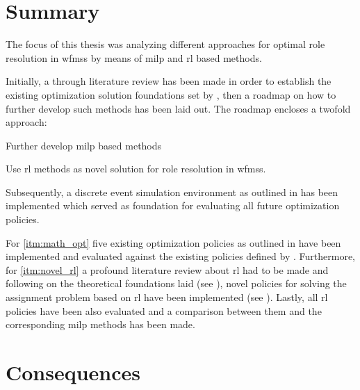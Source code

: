\section{Summary}
\label{sec:summary}

The focus of this thesis was analyzing different approaches for optimal role resolution in \glspl{wfms} by means of \gls{milp} and \gls{rl} based methods.

Initially, a through literature review has been made in order to establish the existing optimization solution \ie foundations set by \citet{Zeng2005}, then a roadmap on how to further develop such methods has been laid out. The roadmap encloses a twofold approach:
\begin{enumerate*}[ref=Approach \Roman*]
 	\item Further develop \gls{milp} based methods \label{itm:math_opt}
 	\item Use \gls{rl} methods as novel solution for role resolution in \glspl{wfms}. \label{itm:novel_rl}
 \end{enumerate*} 

Subsequently, a discrete event simulation environment as outlined in  has been implemented which served as foundation for evaluating all future optimization policies.

For \ref{itm:math_opt} five existing optimization policies as outlined in  have been implemented and evaluated against the existing policies defined by \citet[pp. 13--14]{Zeng2005}. Furthermore, for \ref{itm:novel_rl} a profound literature review about \gls{rl} had to be made and following on the theoretical foundations laid (see ), novel policies for solving the assignment problem based on \gls{rl} have been implemented (see ). Lastly, all \gls{rl} policies have been also evaluated and a comparison between them and the corresponding \gls{milp} methods has been made.

\section{Consequences}
\label{sec:consequences}

